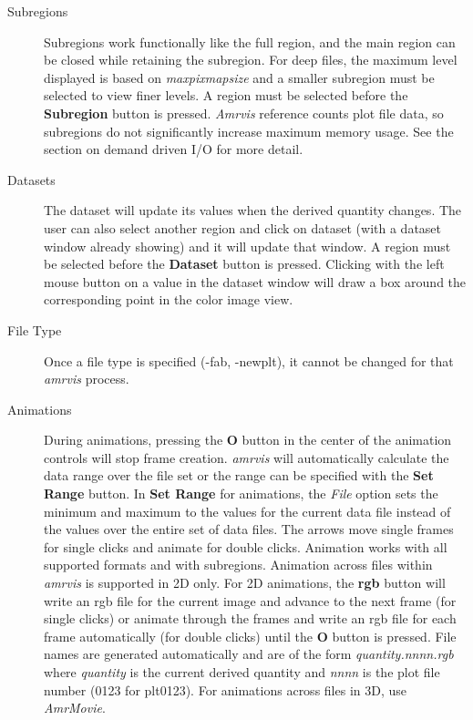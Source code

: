 \begin{description}
\item [Subregions] Subregions work functionally like the full region,
and the main region can be closed while retaining the subregion.
For deep files, the maximum level displayed is based on {\em maxpixmapsize}
and a smaller subregion must be selected to view finer levels.
A region must be selected before the {\bf Subregion} button is pressed.
{\em Amrvis} reference counts plot file data, so subregions do not
significantly increase maximum memory usage.  See the section on
demand driven I/O for more detail.

\item [Datasets]  The dataset will update its values when
the derived quantity changes.  The user can also select another region
and click on dataset (with a dataset window already showing) and it
will update that window.
A region must be selected before the {\bf Dataset} button is
pressed.  Clicking with the left mouse button on a value in the
dataset window will draw a box around the corresponding point in the
color image view.

\item [File Type]
Once a file type is specified (-fab, -newplt), it cannot be changed for that
{\em amrvis} process.

\item [Animations] During animations, pressing the {\bf O} button
in the center of the animation controls will stop frame creation.
{\em amrvis} will automatically calculate the data range over
the file set or the range can be specified with the {\bf Set Range} button.
In {\bf Set Range} for animations, the {\em File} option sets
the minimum and maximum to the values for the current data file
instead of the values over the entire set of data files.
The arrows move single frames for single clicks and animate for double clicks.
Animation works with all supported formats and with subregions.
Animation across files within {\em amrvis} is supported in 2D only.
For 2D animations, the {\bf rgb} button will write an rgb file
for the current image and advance to the next frame (for single clicks)
or animate through the frames and write an rgb file for each frame
automatically (for double clicks) until the {\bf O} button is pressed.
File names are generated automatically and are of the form
{\em quantity.nnnn.rgb} where {\em quantity} is the current derived quantity and
{\em nnnn} is the plot file number (0123 for plt0123).
For animations across files in 3D, use {\em AmrMovie}.


\end{description}
